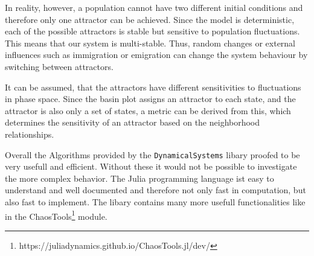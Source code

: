 \documentclass[a4paper,12pt, twoside]{article} %
\begin{document}
In reality, however, a population cannot have two different initial conditions and therefore only one attractor can be achieved. 
Since the model is deterministic, each of the possible attractors is stable but sensitive to population fluctuations. This means that our system is multi-stable.
Thus, random changes or external influences such as immigration or emigration can change the system behaviour by switching between attractors. 


It can be assumed, that the attractors have different sensitivities to fluctuations in phase space. 
Since the basin plot assigns an attractor to each state, and the attractor is also only a set of states,
a metric can be derived from this, which determines the sensitivity of an attractor based on the neighborhood relationships.


Overall the Algorithms provided by the \texttt{DynamicalSystems} libary proofed to be very usefull and efficient. Without these it would not be possible to investigate the more complex behavior. The
Julia programming language ist easy to understand and well documented and therefore not only fast in computation, but also fast to implement. The libary
contains many more usefull functionalities like in the ChaosTools\footnote[1]{https://juliadynamics.github.io/ChaosTools.jl/dev/} module. 

\thispagestyle{justline}
\printbibliography[]
\end{document}
